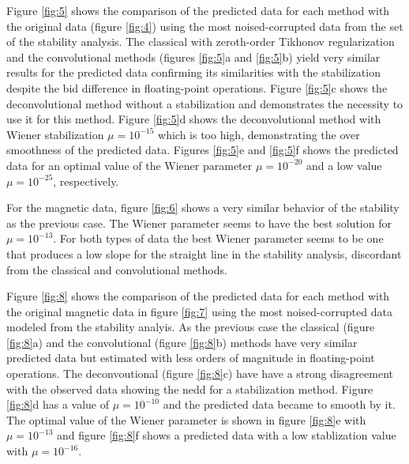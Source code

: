 Figure \ref{fig:5} shows the comparison of the predicted data for each method with the original data (figure \ref{fig:4}) using the most noised-corrupted data from the set of the stability analysis. The classical with zeroth-order Tikhonov regularization and the convolutional methods (figures \ref{fig:5}a and \ref{fig:5}b) yield very similar results for the predicted data confirming its similarities with the stabilization despite the bid difference in floating-point operations. Figure \ref{fig:5}c shows the deconvolutional method without a stabilization and demonstrates the necessity to use it for this method. Figure \ref{fig:5}d shows the deconvolutional method with Wiener stabilization $\mu = 10^{-15}$ which is too high, demonstrating the over smoothness of the predicted data. Figures \ref{fig:5}e and \ref{fig:5}f shows the predicted data for an optimal value of the Wiener parameter $\mu = 10^{-20}$ and a low value $\mu = 10^{-25}$, respectively. 

For the magnetic data, figure \ref{fig:6} shows a very similar behavior of the stability as the previous case. The Wiener parameter seems to have the best solution for $\mu = 10^{-13}$. For both types of data the best Wiener parameter seems to be one that produces a low slope for the straight line in the stability analysis, discordant from the classical and convolutional methods. 

Figure \ref{fig:8} shows the comparison of the predicted data for each method with the original magnetic data in figure \ref{fig:7} using the most noised-corrupted data modeled from the stability analyis. As the previous case the classical (figure \ref{fig:8}a) and the convolutional (figure \ref{fig:8}b) methods have very similar predicted data but estimated with less orders of magnitude in floating-point operations. The deconvoutional (figure \ref{fig:8}c) have have a strong disagreement with the observed data showing the nedd for a stabilization method.
Figure \ref{fig:8}d has a value of $\mu = 10^{-10}$ and the predicted data became to smooth by it. The optimal value of the Wiener parameter is shown in figure \ref{fig:8}e with $\mu = 10^{-13}$ and figure \ref{fig:8}f shows a predicted data with a low stablization value with $\mu = 10^{-16}$.


